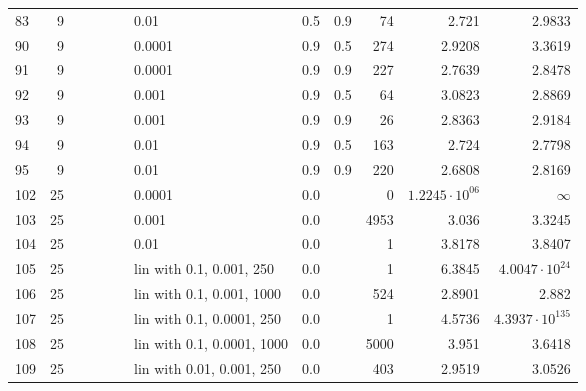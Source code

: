 \begin{longtable}{lrrrrrlrrrrr}
   83 &       9 &   &   &   &   &                        0.01 &      0.5 &    0.9 &      74 &                  2.721 &                 2.9833 \\
   90 &       9 &   &   &   &   &                      0.0001 &      0.9 &    0.5 &     274 &                 2.9208 &                 3.3619 \\
   91 &       9 &   &   &   &   &                      0.0001 &      0.9 &    0.9 &     227 &                 2.7639 &                 2.8478 \\
   92 &       9 &   &   &   &   &                       0.001 &      0.9 &    0.5 &      64 &                 3.0823 &                 2.8869 \\
   93 &       9 &   &   &   &   &                       0.001 &      0.9 &    0.9 &      26 &                 2.8363 &                 2.9184 \\
   94 &       9 &   &   &   &   &                        0.01 &      0.9 &    0.5 &     163 &                  2.724 &                 2.7798 \\
   95 &       9 &   &   &   &   &                        0.01 &      0.9 &    0.9 &     220 &                 2.6808 &                 2.8169 \\
  102 &      25 &   &   &   &   &                      0.0001 &      0.0 &        &       0 &  $1.2245\cdot 10^{06}$ &               $\infty$ \\
  103 &      25 &   &   &   &   &                       0.001 &      0.0 &        &    4953 &                  3.036 &                 3.3245 \\
  104 &      25 &   &   &   &   &                        0.01 &      0.0 &        &       1 &                 3.8178 &                 3.8407 \\
  105 &      25 &   &   &   &   &    lin with 0.1, 0.001, 250 &      0.0 &        &       1 &                 6.3845 &  $4.0047\cdot 10^{24}$ \\
  106 &      25 &   &   &   &   &   lin with 0.1, 0.001, 1000 &      0.0 &        &     524 &                 2.8901 &                  2.882 \\
  107 &      25 &   &   &   &   &   lin with 0.1, 0.0001, 250 &      0.0 &        &       1 &                 4.5736 & $4.3937\cdot 10^{135}$ \\
  108 &      25 &   &   &   &   &  lin with 0.1, 0.0001, 1000 &      0.0 &        &    5000 &                  3.951 &                 3.6418 \\
  109 &      25 &   &   &   &   &   lin with 0.01, 0.001, 250 &      0.0 &        &     403 &                 2.9519 &                 3.0526 \\

\end{longtable}
